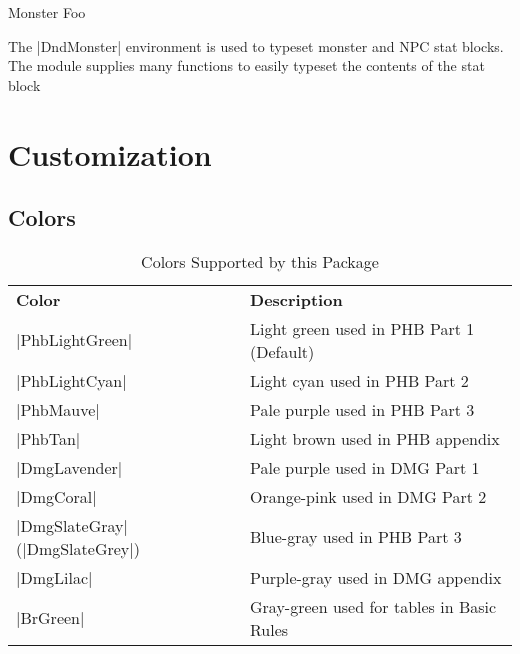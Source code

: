 \documentclass[letterpaper,twocolumn,openany,nodeprecatedcode]{dndbook}
\begin{document}
\begin{DndMonster}[float*=b,width=\textwidth + 8pt]{Monster Foo}
\begin{multicols}{2}
    \begin{DndMonsterLegendaryActions}
    \end{DndMonsterLegendaryActions}
  \end{multicols}
\end{DndMonster}

The |DndMonster| environment is used to typeset monster and NPC stat blocks. The module supplies many functions to easily typeset the contents of the stat block

\part{Customization}

\chapter{Colors}

\begin{table*}[b]
  \caption{\DndFontTableTitle{}Colors Supported by this Package}\label{tab:colors}

  \begin{tabularx}{\linewidth}{lX}
    \textbf{Color}                  & \textbf{Description} \\
    \rowcolor{PhbLightGreen}
    |PhbLightGreen|                 & Light green used in PHB Part 1 (Default) \\
    \rowcolor{PhbLightCyan}
    |PhbLightCyan|                  & Light cyan used in PHB Part 2 \\
    \rowcolor{PhbMauve}
    |PhbMauve|                      & Pale purple used in PHB Part 3 \\
    \rowcolor{PhbTan}
    |PhbTan|                        & Light brown used in PHB appendix \\
    \rowcolor{DmgLavender}
    |DmgLavender|                   & Pale purple used in DMG Part 1 \\
    \rowcolor{DmgCoral}
    |DmgCoral|                      & Orange-pink used in DMG Part 2 \\
    \rowcolor{DmgSlateGray}
    |DmgSlateGray| (|DmgSlateGrey|) & Blue-gray used in PHB Part 3 \\
    \rowcolor{DmgLilac}
    |DmgLilac|                      & Purple-gray used in DMG appendix \\
    \rowcolor{BrGreen}
    |BrGreen|                       & Gray-green used for tables in Basic Rules\\
  \end{tabularx}
\end{table*}
\end{document}
